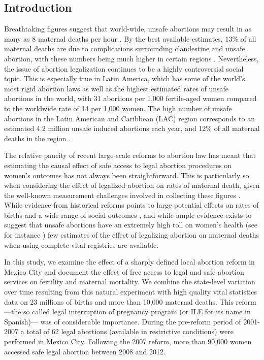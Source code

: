 \documentclass[a4paper, 11pt]{article}
\begin{document}
\begin{spacing}{2}
\section{Introduction}
Breathtaking figures suggest that world-wide, unsafe abortions may result in as many as 8 maternal deaths per hour \citep{TheLancet2009}.  By the best available estimates, 13\% of all maternal deaths are due to complications surrounding clandestine and unsafe abortion, with these numbers being much higher in certain regions \citep{WHO2011}.  Nevertheless, the issue of abortion legalization continues to be a highly controversial social topic.  This is especially true in Latin America, which has some of the world's most rigid abortion laws \citep{UN2014} as well as the highest estimated rates of unsafe abortions in the world, with 31 abortions per 1,000 fertile-aged women compared to the worldwide rate of 14 per 1,000 women. The high number of unsafe abortions in the Latin American and Caribbean (LAC) region corresponds to an estimated 4.2 million unsafe induced abortions each year, and 12\% of all maternal deaths in the region \citep{WHO2011}.

The relative paucity of recent large-scale reforms to abortion law has meant that estimating the causal effect of safe access to legal abortion procedures on women's outcomes has not always been straightforward. %
This is particularly so when considering the effect of legalized abortion on rates of maternal death, given the well-known measurement challenges involved in collecting these figures \citep{hogan2010maternal}.  While evidence from historical reforms points to large potential effects on rates of births and a wide range of social outcomes \citep{Ananatetal2009,AngristEvans,DonohueLevitt2001,CharlesStephens2002,Baileyetal2013,Pop-Eleches}, and while ample evidence exists to suggest that unsafe abortions have an extremely high toll on women's health (see for instance \cite{Grimes2006}) few estimates of the effect of legalizing abortion on maternal deaths when using complete vital registries are available.

In this study, we examine the effect of a sharply defined local abortion reform in Mexico City and document the effect of free access to legal and safe abortion services on fertility and maternal mortality.  We combine the state-level variation over time resulting from this natural experiment with high quality vital statistics data on 23 millions of births and more than 10,000 maternal deaths.  This reform---the so called legal interruption of pregnancy program (or ILE for its name in Spanish)--- was of considerable importance.  During the pre-reform period of 2001-2007 a total of 62 legal abortions (available in restrictive conditions) were performed in Mexico City.  Following the 2007 reform, more than 90,000 women accessed safe legal abortion between 2008 %
 and 2012.


\end{spacing}
\end{document}
